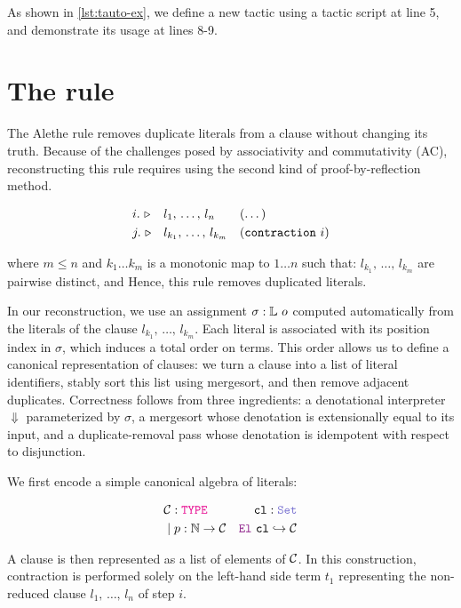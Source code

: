 As shown in \cref{lst:tauto-ex}, we define a new tactic  using a tactic script at line 5, and demonstrate its usage at lines 8-9.


\section{The \texttt{} rule}
\label{sec:contraction-recon}

The Alethe rule  removes duplicate literals from a clause without changing its truth.
Because of the challenges posed by associativity and commutativity (AC), reconstructing this rule requires using the second kind of proof-by-reflection method.

\begin{align*}
&i.~\triangleright &  &l_1,\, \dots,\, l_{n}       & & (\dots)  \\
&j.~\triangleright &  &l_{k_1},\, \dots,\, l_{k_m} & & (\kw{contraction}~i) 
\end{align*}

where $m \leq n$ and $k_1 \dots k_m$ is a monotonic map to $1 \dots n$ such that: $l_{k_1},\, \dots,\, l_{k_m}$ are pairwise distinct, and Hence, this rule removes duplicated literals.

In our reconstruction, we use an assignment $\sigma: \bb{L}~o$ computed automatically from the literals of the clause $l_{k_1},\, \dots,\, l_{k_m}$.
Each literal is associated with its position index in $\sigma$, which induces a total order on terms. 
This order allows us to define a canonical representation of clauses: we turn a clause into a list of literal identifiers, stably sort this list using mergesort, and then remove adjacent duplicates.  
Correctness follows from three ingredients: a denotational interpreter $\Downarrow$ parameterized by $\sigma$, a mergesort whose denotation is extensionally equal to its input, and a duplicate-removal pass whose denotation is idempotent with respect to disjunction.

We first encode a simple canonical algebra of literals:

\begin{align*}
&\cal{C} : \type & \kw{cl}: \set  \\
&\pipe p : \N \ra \cal{C} &\el~\kw{cl} \re \cal{C}
\end{align*}

A clause is then represented as a list of elements of $\cal{C}$.
In this construction, contraction is performed solely on the left-hand side term $t_1$ representing the non-reduced clause $l_1,\, \dots,\, l_{n}$ of step $i$.

